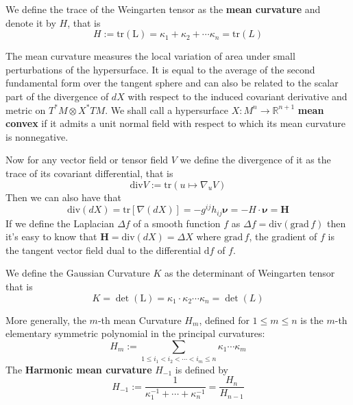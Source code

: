 \begin{definition}\label{def:Mean Curvature}
    We define the trace of the Weingarten tensor as the \textbf{mean curvature} and denote it by $H$, that is
    \begin{equation}
        H:=\mathrm{tr}(\mathrm{L})=\kappa_1+\kappa_2+\cdots\kappa_n=\mathrm{tr}(L)
    \end{equation}
\end{definition}

The mean curvature measures the local variation of area under small perturbations of the hypersurface. It is equal to the average of the second fundamental form over the tangent sphere and can also be related to the scalar part of the divergence of $dX$ with respect to the induced covariant derivative and metric on $T^*M\otimes X^* TM$. We shall call a hypersurface $X:M^n\to\mathbb{R}^{n+1}$ \textbf{mean convex} if it admits a unit normal field with respect to which its mean curvature is nonnegative.

Now for any vector field or tensor field $V$ we define the divergence of it as the trace of its covariant differential, that is
\begin{equation}\label{eq:H-1-5}
    \mathrm{div} V:=\mathrm{tr}(u\mapsto\nabla_u V)
\end{equation}
Then we can also have that
\begin{equation*}
    \mathrm{div}(dX)=\mathrm{tr}[\nabla(dX)]=-g^{ij}h_{ij}\boldsymbol{\nu}=-H\cdot\boldsymbol{\nu}=\boldsymbol{H}
\end{equation*}
If we define the Laplacian $\Delta f$ of a smooth function $f$ as $\Delta f=\mathrm{div}(\mathrm{grad}\, f)$ then it's easy to know that $\boldsymbol{H}=\mathrm{div}(dX)=\Delta X$ where $\mathrm{grad}\,{f}$, the gradient of $f$ is the tangent vector field dual to the differential $\mathrm{d} f$ of $f$.

\begin{definition}\label{def:Gaussian Curvature}
    We define the Gaussian Curvature $K$ as the determinant of Weingarten tensor that is
    \begin{equation}
        K=\det{(\mathrm{L})}=\kappa_1\cdot\kappa_2\cdots\kappa_n=\det{(L)}
    \end{equation}
\end{definition}

More generally, the $m$-th mean Curvature $H_m$, defined for $1\le m\le n$ is the $m$-th elementary symmetric polynomial in the principal curvatures:
\begin{equation*}
    H_m:=\sum_{1\le i_1<i_2<\cdots<i_m\le n} \kappa_1\cdots\kappa_m
\end{equation*}
The \textbf{Harmonic mean curvature} $H_{-1}$ is defined by
\begin{equation*}
    H_{-1}:=\frac{1}{\kappa^{-1}_{1}+\cdots+\kappa^{-1}_{n}}=\frac{H_{n}}{H_{n-1}}
\end{equation*}

